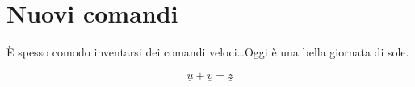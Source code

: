 \documentclass{article}
\newcommand{\eee}{\`e }
\newcommand{\EEE}{\`E }
\newcommand{\vect}[1]{\underline{#1}}
\begin{document}
\section{Nuovi comandi}

\EEE spesso comodo inventarsi dei comandi veloci\dots Oggi \eee una bella giornata di sole.

\[
\vect{u} + \vect{v} = \vect{z}
\]
\end{document}
